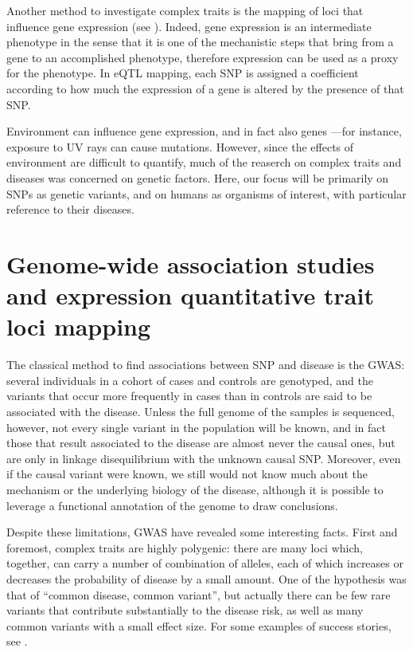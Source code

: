 \documentclass[../main.tex]{subfiles}
\begin{document}
Another method to investigate complex traits is the mapping of loci that 
influence gene expression (see ). Indeed, gene expression 
is an intermediate phenotype in the sense that it is one of the 
mechanistic steps that bring from a gene to an accomplished phenotype, 
therefore expression can be used as a proxy for the phenotype. In eQTL 
mapping, each SNP is assigned a coefficient according to how much the 
expression of a gene is altered by the presence of that SNP.

Environment can influence gene expression, and in fact also genes ---for 
instance, exposure to UV rays can cause mutations. However, since the 
effects of environment are difficult to quantify, much of the reaserch 
on complex traits and diseases was concerned on genetic factors. Here, 
our focus will be primarily on SNPs as genetic variants, and on humans 
as organisms of interest, with particular reference to their diseases.

\section{Genome-wide association studies and expression quantitative 
	trait loci mapping}


The classical method to find associations between SNP and disease is the 
GWAS: several individuals in a cohort of cases and controls are 
genotyped, and the variants that occur more frequently in cases than in 
controls are said to be associated with the disease. Unless the full 
genome of the samples is sequenced, however, not every single variant in 
the population will be known, and in fact those that result associated 
to the disease are almost never the causal ones, but are only in linkage 
disequilibrium with the unknown causal SNP\autocite{Visscher2012}. 
Moreover, even if the causal variant were known, we still would not know 
much about the mechanism or the underlying biology of the disease, 
although it is possible to leverage a functional annotation of the 
genome to draw conclusions.

Despite these limitations, GWAS have revealed some interesting facts. 
First and foremost, complex traits are highly 
polygenic\autocite{Visscher2017}: there are many loci which, together, 
can carry a number of combination of alleles, each of which increases or 
decreases the probability of disease by a small amount. One of the 
hypothesis was that of \enquote{common disease, common variant}, but 
actually there can be few rare variants that contribute substantially to 
the disease risk, as well as many common variants with a small effect 
size. For some examples of success stories, see 
.
\end{document}

